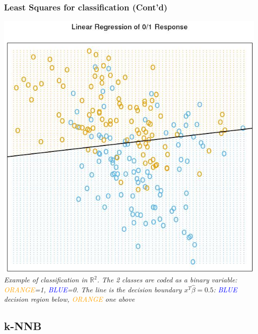 \documentclass[compress, smaller, serif, 9pt]{beamer}
\begin{document}
\begin{frame}
  \frametitle{Least Squares for classification (Cont'd)}
  \begin{center}
    \includegraphics[width=.5\textwidth]{ex_mc.jpg}\\
    {\it \scriptsize
    Example of classification in $\mathbb{R}^2$. The 2 classes are coded as a binary variable: 
    \textcolor{orange}{ORANGE}=1, \textcolor{blue}{BLUE}=0. The line is the decision boundary 
    $x^T \widehat{\beta}= 0.5$: \textcolor{blue}{BLUE} decision region below, \textcolor{orange}{ORANGE} one above
    }
  \end{center}

\end{frame}

\subsection{k-NNB}
\end{document}
